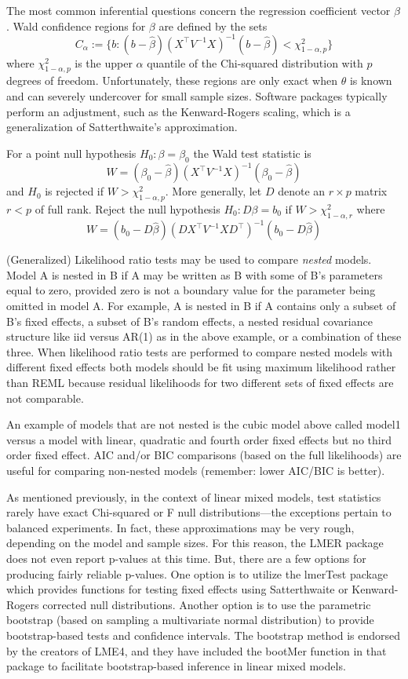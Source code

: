 \documentclass[
]{book}
\begin{document}
The most common inferential questions concern the regression coefficient vector \(\beta\). Wald confidence regions for \(\beta\) are defined by the sets
\[C_\alpha := \{b: (b - \hat\beta)(X^\top V^{-1}X)^{-1}(b - \hat\beta)<\chi^2_{1-\alpha, p}\}\]
where \(\chi^2_{1-\alpha, p}\) is the upper \(\alpha\) quantile of the Chi-squared distribution with \(p\) degrees of freedom. Unfortunately, these regions are only exact when \(\theta\) is known and can severely undercover for small sample sizes. Software packages typically perform an adjustment, such as the Kenward-Rogers scaling, which is a generalization of Satterthwaite's approximation.

For a point null hypothesis \(H_0: \beta = \beta_{0}\) the Wald test statistic is
\[W = (\beta_0 - \hat\beta)(X^\top V^{-1}X)^{-1}(\beta_0 - \hat\beta)\]
and \(H_0\) is rejected if \(W > \chi^2_{1-\alpha, p}\). More generally, let \(D\) denote an \(r\times p\) matrix \(r<p\) of full rank. Reject the null hypothesis \(H_0:D\beta = b_0\) if \(W > \chi^2_{1-\alpha, r}\) where
\[W = (b_0 - D\hat\beta)(D X^\top V^{-1}X D^\top)^{-1}(b_0 - D\hat\beta)\]

(Generalized) Likelihood ratio tests may be used to compare \emph{nested} models. Model A is nested in B if A may be written as B with some of B's parameters equal to zero, provided zero is not a boundary value for the parameter being omitted in model A. For example, A is nested in B if A contains only a subset of B's fixed effects, a subset of B's random effects, a nested residual covariance structure like iid versus AR(1) as in the above example, or a combination of these three. When likelihood ratio tests are performed to compare nested models with different fixed effects both models should be fit using maximum likelihood rather than REML because residual likelihoods for two different sets of fixed effects are not comparable.

An example of models that are not nested is the cubic model above called model1 versus a model with linear, quadratic and fourth order fixed effects but no third order fixed effect. AIC and/or BIC comparisons (based on the full likelihoods) are useful for comparing non-nested models (remember: lower AIC/BIC is better).

As mentioned previously, in the context of linear mixed models, test statistics rarely have exact Chi-squared or F null distributions---the exceptions pertain to balanced experiments. In fact, these approximations may be very rough, depending on the model and sample sizes. For this reason, the LMER package does not even report p-values at this time. But, there are a few options for producing fairly reliable p-values. One option is to utilize the lmerTest package which provides functions for testing fixed effects using Satterthwaite or Kenward-Rogers corrected null distributions. Another option is to use the parametric bootstrap (based on sampling a multivariate normal distribution) to provide bootstrap-based tests and confidence intervals. The bootstrap method is endorsed by the creators of LME4, and they have included the bootMer function in that package to facilitate bootstrap-based inference in linear mixed models.
\end{document}
